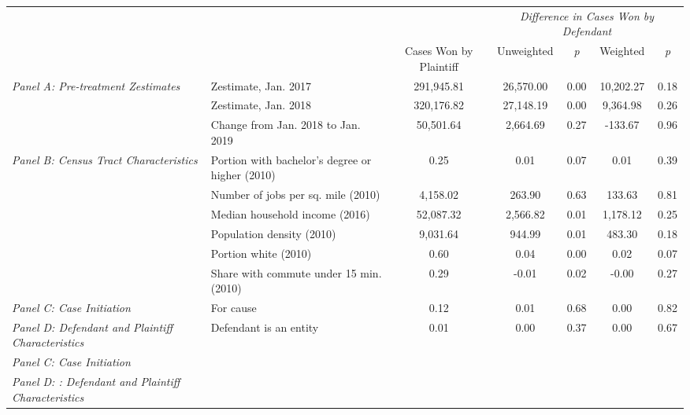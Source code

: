 \begin{tabular}{llccccc}
\toprule
 &  & \textit{} & \multicolumn{4}{c}{\textit{Difference in Cases Won by Defendant}} \\
 &  & Cases Won by Plaintiff & Unweighted & \emph{p} & Weighted & \emph{p} \\
\midrule
\multirow[c]{3}{3cm}{\textit{Panel A: Pre-treatment Zestimates}} & Zestimate, Jan. 2017 & 291,945.81 & 26,570.00 & 0.00 & 10,202.27 & 0.18 \\
 & Zestimate, Jan. 2018 & 320,176.82 & 27,148.19 & 0.00 & 9,364.98 & 0.26 \\
 & Change from Jan. 2018 to Jan. 2019 & 50,501.64 & 2,664.69 & 0.27 & -133.67 & 0.96 \\
\cline{1-7}
\multirow[c]{6}{3cm}{\textit{Panel B: Census Tract Characteristics}} & Portion with bachelor's degree or higher (2010) & 0.25 & 0.01 & 0.07 & 0.01 & 0.39 \\
 & Number of jobs per sq. mile (2010) & 4,158.02 & 263.90 & 0.63 & 133.63 & 0.81 \\
 & Median household income (2016) & 52,087.32 & 2,566.82 & 0.01 & 1,178.12 & 0.25 \\
 & Population density (2010) & 9,031.64 & 944.99 & 0.01 & 483.30 & 0.18 \\
 & Portion white (2010) & 0.60 & 0.04 & 0.00 & 0.02 & 0.07 \\
 & Share with commute under 15 min. (2010) & 0.29 & -0.01 & 0.02 & -0.00 & 0.27 \\
\cline{1-7}
\textit{Panel C: Case Initiation} & For cause & 0.12 & 0.01 & 0.68 & 0.00 & 0.82 \\
\cline{1-7}
\textit{Panel D: Defendant and Plaintiff Characteristics} & Defendant is an entity & 0.01 & 0.00 & 0.37 & 0.00 & 0.67 \\
\cline{1-7}
\textit{Panel C: Case Initiation} &   &  &  &  &  &  \\
\cline{1-7}
\textit{Panel D: : Defendant and Plaintiff Characteristics} &   &  &  &  &  &  \\
\cline{1-7}
\bottomrule
\end{tabular}

